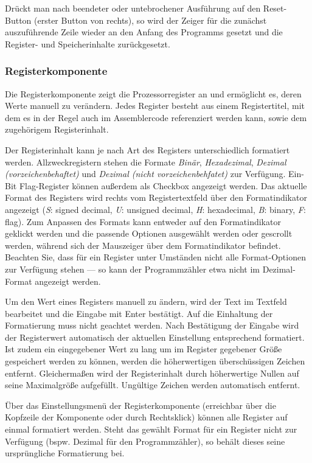 
Drückt man nach beendeter oder untebrochener Ausführung auf den Reset-Button (erster
Button von rechts), so wird der Zeiger für die zunächst auszuführende Zeile wieder
an den Anfang des Programms gesetzt und die Register- und Speicherinhalte zurückgesetzt.



\subsubsection{Registerkomponente}
Die Registerkomponente zeigt die Prozessorregister an und ermöglicht es, deren Werte manuell zu verändern. Jedes Register besteht aus einem Registertitel, mit dem es in der Regel auch im Assemblercode referenziert werden kann, sowie dem zugehörigem Registerinhalt.

Der Registerinhalt kann je nach Art des Registers unterschiedlich formatiert werden. Allzweckregistern stehen die Formate \textit{Binär}, \textit{Hexadezimal}, \textit{Dezimal (vorzeichenbehaftet)} und \textit{Dezimal (nicht vorzeichenbehfatet)} zur Verfügung. Ein-Bit Flag-Register können außerdem als Checkbox angezeigt werden.
Das aktuelle Format des Registers wird rechts vom Registertextfeld über den Formatindikator angezeigt (\textit{S}: signed decimal, \textit{U}: unsigned decimal, \textit{H}: hexadecimal, \textit{B}: binary, \textit{F}: flag). Zum Anpassen des Formats kann entweder auf den Formatindikator geklickt werden und die passende Optionen ausgewählt werden oder gescrollt werden, während sich der Mauszeiger über dem Formatindikator befindet. Beachten Sie, dass für ein Register unter Umständen nicht alle Format-Optionen zur Verfügung stehen --- so kann der Programmzähler etwa nicht im Dezimal-Format angezeigt werden.

Um den Wert eines Registers manuell zu ändern, wird der Text im Textfeld bearbeitet und die Eingabe mit Enter bestätigt. Auf die Einhaltung der Formatierung muss nicht geachtet werden. Nach Bestätigung der Eingabe wird der Registerwert automatisch der aktuellen Einstellung entsprechend formatiert. Ist zudem ein eingegebener Wert zu lang um im Register gegebener Größe gespeichert werden zu können, werden die höherwertigen überschüssigen Zeichen entfernt. Gleichermaßen wird der Registerinhalt durch höherwertige Nullen auf seine Maximalgröße aufgefüllt. Ungültige Zeichen werden automatisch entfernt.

Über das Einstellungsmenü der Registerkomponente (erreichbar über die Kopfzeile der Komponente oder durch Rechtsklick) können alle Register auf einmal formatiert werden. Steht das gewählt Format für ein Register nicht zur Verfügung (bspw. Dezimal für den Programmzähler), so behält dieses seine ursprüngliche Formatierung bei.

